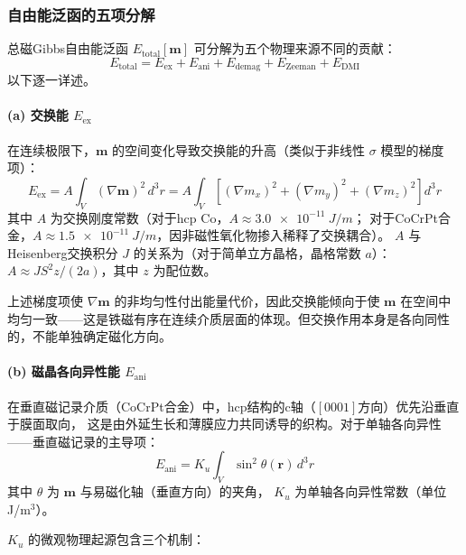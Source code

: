\documentclass[11pt,a4paper,twoside]{article}
\theoremstyle{definition}
\theoremstyle{plain}
\theoremstyle{remark}
\begin{document}
\subsubsection{自由能泛函的五项分解}

总磁Gibbs自由能泛函 $E_{\text{total}}[\mathbf{m}]$ 可分解为五个物理来源不同的贡献：
\begin{equation}\label{eq:free-energy}
  E_{\text{total}} = E_{\text{ex}} + E_{\text{ani}} + E_{\text{demag}}
                   + E_{\text{Zeeman}} + E_{\text{DMI}}
\end{equation}
以下逐一详述。

\paragraph{(a) 交换能 $E_{\text{ex}}$}

在连续极限下，$\mathbf{m}$ 的空间变化导致交换能的升高（类似于非线性 $\sigma$ 模型的梯度项）：
\begin{equation}\label{eq:exchange}
  E_{\text{ex}} = A \int_V (\nabla \mathbf{m})^2 \, d^3r
  = A \int_V \left[ (\nabla m_x)^2 + (\nabla m_y)^2 + (\nabla m_z)^2 \right] d^3r
\end{equation}
其中 $A$ 为交换刚度常数（对于hcp Co，$A \approx \SI{3.0e-11}{J/m}$；
对于CoCrPt合金，$A \approx \SI{1.5e-11}{J/m}$，因非磁性氧化物掺入稀释了交换耦合）。
$A$ 与Heisenberg交换积分 $J$ 的关系为（对于简单立方晶格，晶格常数 $a$）：
$A \approx J S^2 z / (2a)$，其中 $z$ 为配位数。

上述梯度项使 $\nabla \mathbf{m}$ 的非均匀性付出能量代价，因此交换能倾向于使 $\mathbf{m}$ 在空间中
均匀一致——这是铁磁有序在连续介质层面的体现。但交换作用本身是各向同性的，不能单独确定磁化方向。

\paragraph{(b) 磁晶各向异性能 $E_{\text{ani}}$}

在垂直磁记录介质（CoCrPt合金）中，hcp结构的c轴（$[0001]$方向）优先沿垂直于膜面取向，
这是由外延生长和薄膜应力共同诱导的织构。对于单轴各向异性——垂直磁记录的主导项：
\begin{equation}\label{eq:anisotropy}
  E_{\text{ani}} = K_u \int_V \sin^2\theta(\mathbf{r}) \, d^3r
\end{equation}
其中 $\theta$ 为 $\mathbf{m}$ 与易磁化轴（垂直方向）的夹角，
$K_u$ 为单轴各向异性常数（单位 J/m$^3$）。

$K_u$ 的微观物理起源包含三个机制：
\end{document}
